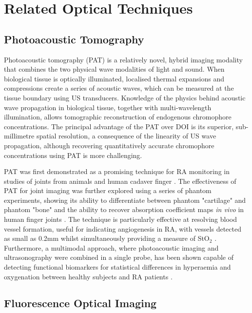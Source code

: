 \documentclass[twoside]{bhamthesis}
\theoremstyle{definition}
\begin{document}
\section{Related Optical Techniques}

\subsection{Photoacoustic Tomography}

Photoacoustic tomography (PAT) is a relatively novel, hybrid imaging modality that combines the two physical wave modalities of light and sound. When biological tissue is optically illuminated, localised thermal expansions and compressions create a series of acoustic waves, which can be measured at the tissue boundary using US transducers. Knowledge of the physics behind acoustic wave propagation in biological tissue, together with multi-wavelength illumination, allows tomographic reconstruction of endogenous chromophore concentrations. The principal advantage of the PAT over DOI is its superior, sub-millimetre spatial resolution, a consequence of the linearity of US wave propagation, although recovering quantitatively accurate chromophore concentrations using PAT is more challenging.

PAT was first demonstrated as a promising technique for RA monitoring in studies of joints from animals and human cadaver finger \cite{wang2006imaging}. The effectiveness of PAT for joint imaging was further explored using a series of phantom experiments, showing its ability to differentiate between phantom "cartilage" and phantom "bone" \cite{sun2009quantitative} and the ability to recover absorption coefficient maps \textit{in vivo} in human finger joints \cite{sun2009quantitative2}. The technique is particularly effective at resolving blood vessel formation, useful for indicating angiogenesis in RA, with vessels detected as small as 0.2mm whilst simultaneously providing a measure of StO$_2$ \cite{deng2016noninvasively}. Furthermore, a multimodal approach, where photoacoustic imaging and ultrasonography were combined in a single probe, has been shown capable of detecting functional biomarkers for statistical differences in hyperaemia and oxygenation between healthy subjects and RA patients \cite{jo2017photoacoustic,jo2017functional}. 

\subsection{Fluorescence Optical Imaging}
\end{document}
